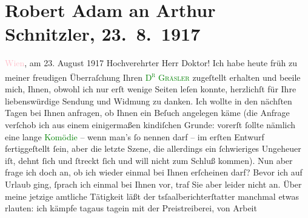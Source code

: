 

               \section[Robert Adam an Arthur Schnitzler, 23. 8. 1917]{ Robert Adam an Arthur Schnitzler, 23. 8. 1917}\nopagebreak{}\rehead{ }\normalsize\beginnumbering{} \toendnotes[C]{\smallbreak\pagebreak[2]} 
\toendnotes[C]{\smallbreak}\pstart
           \raggedleft{}{\pb}\textcolor{pink}{Wien}{}\ledrightnote{\textcolor{pink}{Wien}}, am 23. August 1917\pend
           \pstart{}Hochverehrter Herr Doktor!\pend\pstart
           Ich habe heute früh zu meiner freudigen Überraſchung Ihren \textcolor{green}{\textsc{D\textsuperscript{r}{ }Gräsler}}{}\ledrightnote{\textcolor{green}{Doktor Gräsler, Badearzt}} zugeſtellt erhalten und beeile mich, Ihnen, obwohl ich nur erſt wenige
                    Seiten leſen konnte, herzlichſt für Ihre liebenswürdige Sendung und Widmung zu
                    danken.\pend
           \pstart
           Ich wollte in den nächſten Tagen bei Ihnen anfragen, ob Ihnen ein Beſuch
                    angelegen käme (die Anfrage verſchob ich aus einem einigermaßen kindiſchen
                    Grunde: vorerſt ſollte nämlich eine lange \textcolor{green}{Komödie}{} – wenn man’s ſo  nennen darf – im erſten Entwurf fertiggeſtellt ſein, aber die
                    letzte Szene, die allerdings ein ſchwieriges Unge{\pb}heuer iſt, dehnt ſich und ſtreckt ſich und will nicht zum Schluß kommen). Nun
                    aber frage ich doch an, ob ich wieder einmal bei Ihnen erſcheinen darf? Bevor
                    ich auf Urlaub ging, ſprach ich einmal bei Ihnen vor, traf Sie aber leider nicht
                    an.\pend
           \pstart
           Über meine jetzige amtliche Tätigkeit läßt der tsſaalberichterſtatter manchmal etwas rlauten: ich kämpfe tagaus tagein mit der Preistreiberei, von Arbeit
